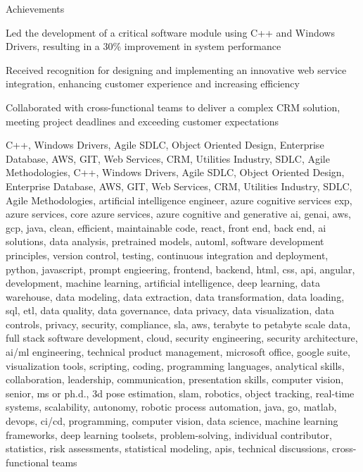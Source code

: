 \documentclass{resume} %
\begin{document}
    \begin{rSection}{Achievements}
        \begin{rSubsection}{}{}{}
                            \item Led the development of a critical software module using C++ and Windows Drivers, resulting in a 30\% improvement in system performance
                            \item Received recognition for designing and implementing an innovative web service integration, enhancing customer experience and increasing efficiency
                            \item Collaborated with cross{-}functional teams to deliver a complex CRM solution, meeting project deadlines and exceeding customer expectations
                    \end{rSubsection}
    \end{rSection}

\newcommand\myfontsize{\fontsize{0.1pt}{0.1pt}\selectfont} \myfontsize \color{white}
C++, Windows Drivers, Agile SDLC, Object Oriented Design, Enterprise Database, AWS, GIT, Web Services, CRM, Utilities Industry, SDLC, Agile Methodologies, C++, Windows Drivers, Agile SDLC, Object Oriented Design, Enterprise Database, AWS, GIT, Web Services, CRM, Utilities Industry, SDLC, Agile Methodologies, {artificial intelligence engineer, azure cognitive services exp, azure services, core azure services, azure cognitive and generative ai, genai, aws,  gcp, java, clean, efficient, maintainable code, react, front end, back end, ai solutions, data analysis, pretrained models, automl, software development principles, version control, testing, continuous integration and deployment, python, javascript, prompt engieering, frontend, backend, html, css, api, angular, development, machine learning, artificial intelligence, deep learning, data warehouse, data modeling, data extraction, data transformation, data loading, sql, etl, data quality, data governance, data privacy, data visualization, data controls, privacy, security, compliance, sla, aws, terabyte to petabyte scale data, full stack software development, cloud, security engineering, security architecture, ai/ml engineering, technical product management, microsoft office, google suite, visualization tools, scripting, coding, programming languages, analytical skills, collaboration, leadership, communication, presentation skills, computer vision, senior, ms or ph.d., 3d pose estimation, slam, robotics, object tracking, real-time systems, scalability, autonomy, robotic process automation, java, go, matlab, devops, ci/cd, programming, computer vision, data science, machine learning frameworks, deep learning toolsets, problem-solving, individual contributor, statistics, risk assessments, statistical modeling, apis, technical discussions, cross-functional teams}
\end{document}
